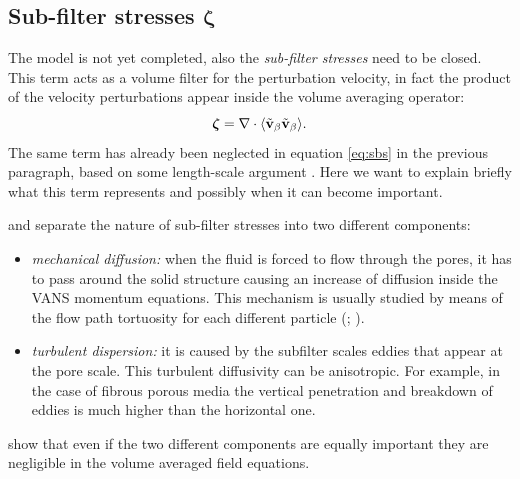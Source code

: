 \subsection{Sub-filter stresses $\boldsymbol{\zeta}$}

The model is not yet completed, also the \textit{sub-filter stresses} need to be closed. This term acts as a volume filter for the perturbation velocity, in fact the product of the velocity perturbations appear inside the volume averaging operator:
$$\boldsymbol{\zeta} = \nabla \cdot {\left< \tilde{\textbf{v}}_{\beta}\tilde{\textbf{v}}_{\beta}\right>}.$$
The same term has already been neglected in equation \eqref{eq:sbs} in the previous paragraph, based on some length-scale argument  \citep{whitaker1996forchheimer}.  Here we want to explain briefly what this term represents and possibly when it can become important.

\citet{breugem2006influence} and \citet{nepf1999drag} separate the nature of sub-filter stresses into two different components:
\begin{itemize}
	\item \textit{mechanical diffusion:} when the fluid is forced to flow through the pores, it has to pass around the solid structure causing an increase of diffusion inside the VANS momentum equations. This mechanism is usually studied by means of the flow path tortuosity for each different particle (\citet{duda2011hydraulic}; \citet{sivanesapillai2014transition}).
	\item \textit{turbulent dispersion:} it is caused by the subfilter scales eddies that appear at the pore scale. This turbulent diffusivity can be anisotropic. For example, in the case of fibrous porous media the vertical penetration and breakdown of eddies is much higher than the horizontal one.
\end{itemize}

\citet{breugem2006influence} show that even if the two different components are equally important they are negligible in the volume averaged field equations.

%


